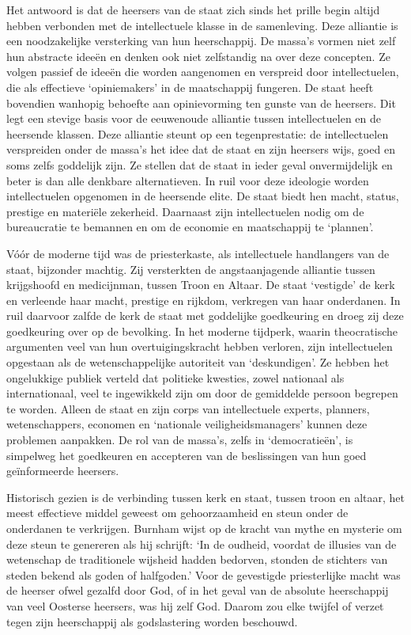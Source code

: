 \documentclass[
  a5paper,
  smalldemyvopaper,10pt,twoside,onecolumn,openright,extrafontsizes,hidelinks]{memoir}
\begin{document}
Het antwoord is dat de heersers van de staat zich sinds het prille begin
altijd hebben verbonden met de intellectuele klasse in de samenleving.
Deze alliantie is een noodzakelijke versterking van hun heerschappij. De
massa's vormen niet zelf hun abstracte ideeën en denken ook niet
zelfstandig na over deze concepten. Ze volgen passief de ideeën die
worden aangenomen en verspreid door intellectuelen, die als effectieve
`opiniemakers' in de maatschappij fungeren. De staat heeft bovendien
wanhopig behoefte aan opinievorming ten gunste van de heersers. Dit legt
een stevige basis voor de eeuwenoude alliantie tussen intellectuelen en
de heersende klassen. Deze alliantie steunt op een tegenprestatie: de
intellectuelen verspreiden onder de massa's het idee dat de staat en
zijn heersers wijs, goed en soms zelfs goddelijk zijn. Ze stellen dat de
staat in ieder geval onvermijdelijk en beter is dan alle denkbare
alternatieven. In ruil voor deze ideologie worden intellectuelen
opgenomen in de heersende elite. De staat biedt hen macht, status,
prestige en materiële zekerheid. Daarnaast zijn intellectuelen nodig om
de bureaucratie te bemannen en om de economie en maatschappij te
`plannen'.

Vóór de moderne tijd was de priesterkaste, als intellectuele handlangers
van de staat, bijzonder machtig. Zij versterkten de angstaanjagende
alliantie tussen krijgshoofd en medicijnman, tussen Troon en Altaar. De
staat `vestigde' de kerk en verleende haar macht, prestige en rijkdom,
verkregen van haar onderdanen. In ruil daarvoor zalfde de kerk de staat
met goddelijke goedkeuring en droeg zij deze goedkeuring over op de
bevolking. In het moderne tijdperk, waarin theocratische argumenten veel
van hun overtuigingskracht hebben verloren, zijn intellectuelen
opgestaan als de wetenschappelijke autoriteit van `deskundigen'. Ze
hebben het ongelukkige publiek verteld dat politieke kwesties, zowel
nationaal als internationaal, veel te ingewikkeld zijn om door de
gemiddelde persoon begrepen te worden. Alleen de staat en zijn corps van
intellectuele experts, planners, wetenschappers, economen en `nationale
veiligheidsmanagers' kunnen deze problemen aanpakken. De rol van de
massa's, zelfs in `democratieën', is simpelweg het goedkeuren en
accepteren van de beslissingen van hun goed geïnformeerde heersers.

Historisch gezien is de verbinding tussen kerk en staat, tussen troon en
altaar, het meest effectieve middel geweest om gehoorzaamheid en steun
onder de onderdanen te verkrijgen. Burnham wijst op de kracht van mythe
en mysterie om deze steun te genereren als hij schrijft: `In de oudheid,
voordat de illusies van de wetenschap de traditionele wijsheid hadden
bedorven, stonden de stichters van steden bekend als goden of
halfgoden.' Voor de gevestigde priesterlijke macht was de heerser ofwel
gezalfd door God, of in het geval van de absolute heerschappij van veel
Oosterse heersers, was hij zelf God. Daarom zou elke twijfel of verzet
tegen zijn heerschappij als godslastering worden beschouwd.
\end{document}
